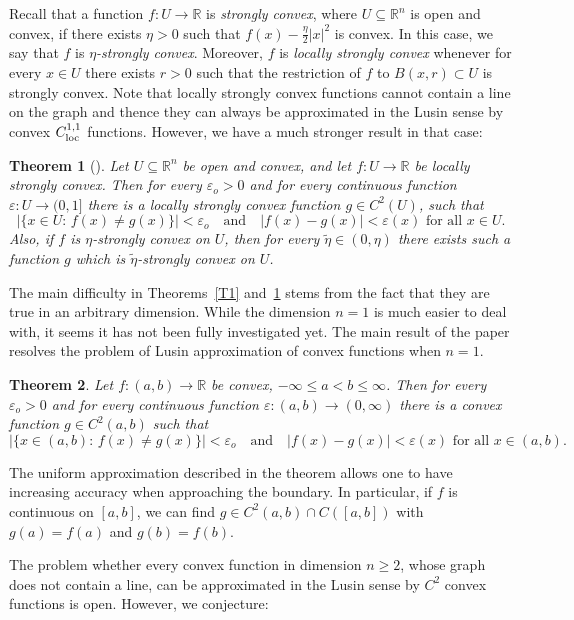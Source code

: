 \documentclass[intlimits,12pt,reqno]{amsart}
\newcommand{\bbbr}{\mathbb R}
\newcommand{\R}{\mathbb R}
\newcommand{\eps}{\varepsilon}
\newtheorem{theorem}{Theorem}[section]
\theoremstyle{definition}
\begin{document}
Recall that a function $f: U \to \R$ is {\em strongly convex}, where $U \subseteq \R^n$ is open and convex, if there exists $\eta > 0$ such that $f(x) - \frac{\eta}{2}|x|^2$ is convex. In this case, we say that $f$ is {\em $\eta$-strongly convex}. Moreover, $f$ is {\em locally strongly convex} whenever for every $x \in U$ there exists $r > 0$ such that the restriction of $f$ to $B(x, r) \subset U$ is strongly convex. Note that locally strongly convex functions cannot contain a line on the graph and thence they can always be approximated in the Lusin sense by convex $C^{1,1}_{\rm loc}$ functions. However, we have a much stronger result in that case:

\begin{theorem}[\cite{ADH}]
\label{T2}
Let $U\subseteq\R^n$ be open and convex, and let $f:U\to\bbbr$ be locally strongly convex. Then for every $\eps_o>0$ and for every continuous function $\varepsilon:U\to (0, 1]$ there is a locally strongly convex function
$g\in C^2(U)$, such that
$$|\{x\in U:\, f(x)\neq g(x)\}|<\eps_o
\quad
\text{and}
\quad
|f(x)-g(x)|<\varepsilon(x) \text{ for all } x\in U.
$$
Also, if $f$ is $\eta$-strongly convex on $U$, then for every $\widetilde{\eta}\in (0, \eta)$ there exists such a function $g$ which is $\widetilde{\eta}$-strongly convex on $U$.
\end{theorem}


The main difficulty in Theorems~\ref{T1} and~\ref{T2} stems from the fact that they are true in an arbitrary dimension. While the dimension $n=1$ is much easier to deal with, it seems it has not been fully investigated yet. The main result of the paper resolves the problem of Lusin approximation of convex functions when $n=1$.

\begin{theorem}
\label{T3}
Let $f:(a,b)\to\bbbr$ be convex, $-\infty\leq a<b\leq\infty$. Then for every $\eps_o>0$ and for every continuous function $\eps:(a,b)\to (0,\infty)$ there is a convex function $g\in C^2(a,b)$ such that
$$
|\{x\in (a,b):\, f(x)\neq g(x)\}|<\eps_o
\quad
\text{and}
\quad
|f(x)-g(x)|<\eps(x) \text{ for all } x\in (a,b).
$$
\end{theorem}
The uniform approximation described in the theorem allows one to have increasing accuracy when approaching the boundary. In particular, if $f$ is continuous on $[a,b]$, we can find $g\in C^2(a,b)\cap C([a,b])$ with $g(a)=f(a)$ and $g(b)=f(b)$.


The problem whether every convex function in dimension $n\geq 2$, whose graph does not contain a line, can be approximated in the Lusin sense by $C^2$ convex functions is open. However, we conjecture:
\end{document}
